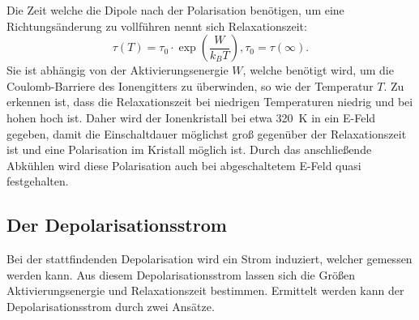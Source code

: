 Die Zeit welche die Dipole nach der Polarisation benötigen,
um eine Richtungsänderung zu vollführen nennt sich Relaxationszeit:
\begin{equation}
    \tau(T) = \tau_0 \cdot \exp\left(\frac{W}{k_B T}\right) , \tau_0 =\tau(\infty).
    \label{eq:Relax}
\end{equation}
Sie ist abhängig von der Aktivierungsenergie $W$,
welche benötigt wird,
um die Coulomb-Barriere des Ionengitters zu überwinden,
so wie der Temperatur $T$.
Zu erkennen ist,
dass die Relaxationszeit bei niedrigen Temperaturen niedrig und bei hohen hoch ist.
Daher wird der Ionenkristall bei etwa \qty{320}{\kelvin} in ein E-Feld gegeben,
damit die Einschaltdauer möglichst groß gegenüber der Relaxationszeit ist und eine Polarisation im Kristall möglich ist.
Durch das anschließende Abkühlen wird diese Polarisation auch bei abgeschaltetem E-Feld quasi festgehalten. 



\subsection{Der Depolarisationsstrom}
Bei der stattfindenden Depolarisation wird ein Strom induziert,
welcher gemessen werden kann. 
Aus diesem Depolarisationsstrom lassen sich die Größen Aktivierungsenergie und Relaxationszeit bestimmen.
Ermittelt werden kann der Depolarisationsstrom durch zwei Ansätze.

